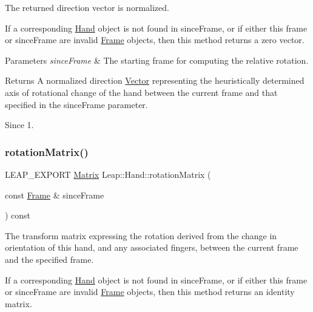 \begin{DoxyCodeInclude}
\end{DoxyCodeInclude}


The returned direction vector is normalized.

If a corresponding \hyperlink{class_leap_1_1_hand}{Hand} object is not found in since\+Frame, or if either this frame or since\+Frame are invalid \hyperlink{class_leap_1_1_frame}{Frame} objects, then this method returns a zero vector.


\begin{DoxyParams}{Parameters}
{\em since\+Frame} & The starting frame for computing the relative rotation. \\
\hline
\end{DoxyParams}
\begin{DoxyReturn}{Returns}
A normalized direction \hyperlink{struct_leap_1_1_vector}{Vector} representing the heuristically determined axis of rotational change of the hand between the current frame and that specified in the since\+Frame parameter. 
\end{DoxyReturn}
\begin{DoxySince}{Since}
1. 
\end{DoxySince}
\mbox{\label{class_leap_1_1_hand_a247046c6a2557e8d7ac28ea68ff925ef}} 
\subsubsection{\texorpdfstring{rotation\+Matrix()}{rotationMatrix()}}
{\footnotesize\ttfamily L\+E\+A\+P\+\_\+\+E\+X\+P\+O\+RT \hyperlink{struct_leap_1_1_matrix}{Matrix} Leap\+::\+Hand\+::rotation\+Matrix (\begin{DoxyParamCaption}\item[{const \hyperlink{class_leap_1_1_frame}{Frame} \&}]{since\+Frame }\end{DoxyParamCaption}) const}

The transform matrix expressing the rotation derived from the change in orientation of this hand, and any associated fingers, between the current frame and the specified frame.


\begin{DoxyCodeInclude}
\end{DoxyCodeInclude}


If a corresponding \hyperlink{class_leap_1_1_hand}{Hand} object is not found in since\+Frame, or if either this frame or since\+Frame are invalid \hyperlink{class_leap_1_1_frame}{Frame} objects, then this method returns an identity matrix.


